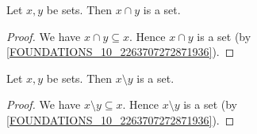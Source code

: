 \documentclass[../../set-theory/set-theory.tex]{subfiles}
\begin{document}
  \begin{forthel}
    \begin{proposition}
      Let $x, y$ be sets.
      Then $x \cap y$ is a set.
    \end{proposition}
    \begin{proof}
      We have $x \cap y \subseteq x$.
      Hence $x \cap y$ is a set (by \cref{FOUNDATIONS_10_2263707272871936}).
    \end{proof}
  \end{forthel}

  \begin{forthel}
    \begin{proposition}
      Let $x, y$ be sets.
      Then $x \setminus y$ is a set.
    \end{proposition}
    \begin{proof}
      We have $x \setminus y \subseteq x$.
      Hence $x \setminus y$ is a set (by \cref{FOUNDATIONS_10_2263707272871936}).
    \end{proof}
  \end{forthel}
\end{document}
